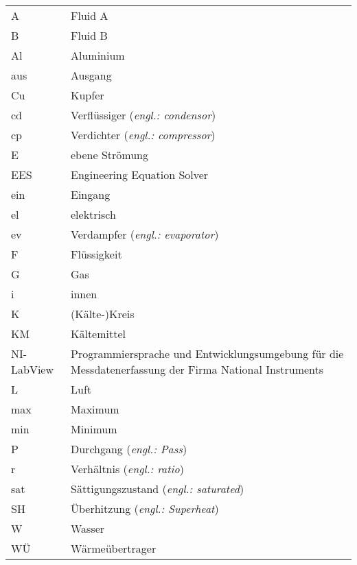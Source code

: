 \begin{onehalfspacing}
\begin{longtable}[h]{p{} p{}}
		A & Fluid A \\
		B & Fluid B \\
		Al & Aluminium\\ 
		aus & Ausgang\\		
		Cu & Kupfer \\
		cd & Verflüssiger (\emph{engl.: condensor})\\
		cp & Verdichter (\emph{engl.: compressor})\\ 
		E & ebene Strömung \\   
		EES & Engineering Equation Solver \\
		ein & Eingang \\
		el & elektrisch \\
		ev & Verdampfer (\emph{engl.: evaporator})\\
		F & Flüssigkeit\\	
		G & Gas \\
		i & innen \\
		K & (Kälte-)Kreis\\
		KM & Kältemittel\\
		NI-LabView & Programmiersprache und Entwicklungsumgebung für die Messdatenerfassung der Firma National Instruments\\
		L & Luft\\
		max & Maximum \\
		min & Minimum \\
		P & Durchgang (\emph{engl.: Pass})\\
		r & Verhältnis (\emph{engl.: ratio})\\
		sat & Sättigungszustand (\emph{engl.: saturated})\\
		SH & Überhitzung (\emph{engl.: Superheat})\\
		W & Wasser \\
		WÜ & Wärmeübertrager \\
		
\end{longtable}
\end{onehalfspacing}
